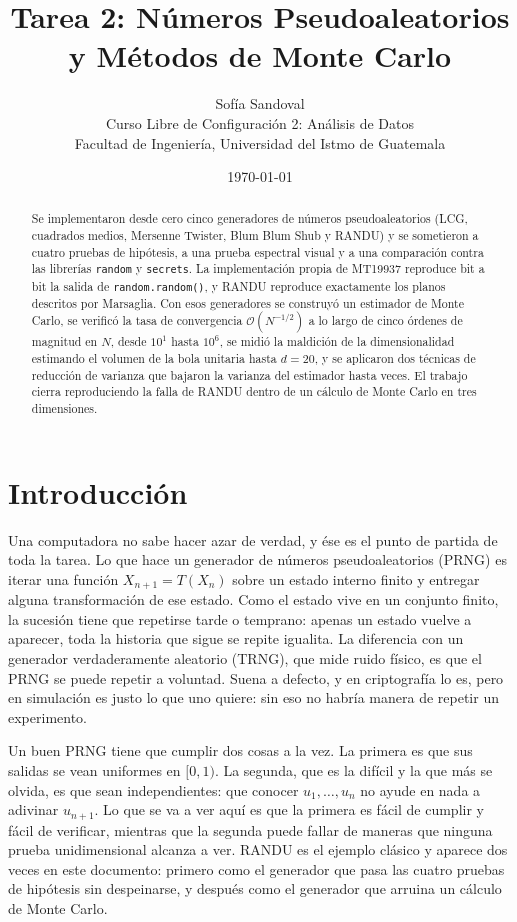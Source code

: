 \documentclass[11pt,letterpaper]{article}
\title{\textbf{Tarea 2: Números Pseudoaleatorios y Métodos de Monte Carlo}}
\author{Sofía Sandoval\\
        Curso Libre de Configuración 2: Análisis de Datos\\
        Facultad de Ingeniería, Universidad del Istmo de Guatemala}
\date{\today}
\newcommand{\code}[1]{\texttt{#1}}
\begin{document}
\maketitle

\begin{abstract}
\noindent
Se implementaron desde cero cinco generadores de números pseudoaleatorios
(LCG, cuadrados medios, Mersenne Twister, Blum Blum Shub y RANDU) y se
sometieron a cuatro pruebas de hipótesis, a una prueba espectral visual y a
una comparación contra las librerías \code{random} y \code{secrets}. La
implementación propia de MT19937 reproduce bit a bit la salida de
\code{random.random()}, y RANDU reproduce exactamente los \PlanosRandu{}
planos descritos por Marsaglia. Con esos generadores se construyó un
estimador de Monte Carlo, se verificó la tasa de convergencia
$\mathcal{O}(N^{-1/2})$ a lo largo de cinco órdenes de magnitud en $N$, desde
$10^1$ hasta $10^6$, se midió la
maldición de la dimensionalidad estimando el volumen de la bola unitaria
hasta $d=20$, y se aplicaron dos técnicas de reducción de varianza que
bajaron la varianza del estimador hasta \FactorControlSeno{} veces. El
trabajo cierra reproduciendo la falla de RANDU dentro de un cálculo de Monte
Carlo en tres dimensiones.
\end{abstract}

\newpage
\tableofcontents
\newpage

\section{Introducción}

Una computadora no sabe hacer azar de verdad, y ése es el punto de partida de
toda la tarea. Lo que hace un generador de números pseudoaleatorios (PRNG) es
iterar una función $X_{n+1} = T(X_n)$ sobre un estado interno finito y
entregar alguna transformación de ese estado. Como el estado vive en un
conjunto finito, la sucesión tiene que repetirse tarde o temprano: apenas un
estado vuelve a aparecer, toda la historia que sigue se repite igualita. La
diferencia con un generador verdaderamente aleatorio (TRNG), que mide ruido
físico, es que el PRNG se puede repetir a voluntad. Suena a defecto, y en
criptografía lo es, pero en simulación es justo lo que uno quiere: sin eso no
habría manera de repetir un experimento.

Un buen PRNG tiene que cumplir dos cosas a la vez. La primera es que sus
salidas se vean uniformes en $[0,1)$. La segunda, que es la difícil y la que
más se olvida, es que sean independientes: que conocer $u_1,\dots,u_n$ no
ayude en nada a adivinar $u_{n+1}$. Lo que se va a ver aquí es que la primera
es fácil de cumplir y fácil de verificar, mientras que la segunda puede
fallar de maneras que ninguna prueba unidimensional alcanza a ver. RANDU es
el ejemplo clásico y aparece dos veces en este documento: primero como el
generador que pasa las cuatro pruebas de hipótesis sin despeinarse, y después
como el generador que arruina un cálculo de Monte Carlo.
\end{document}
